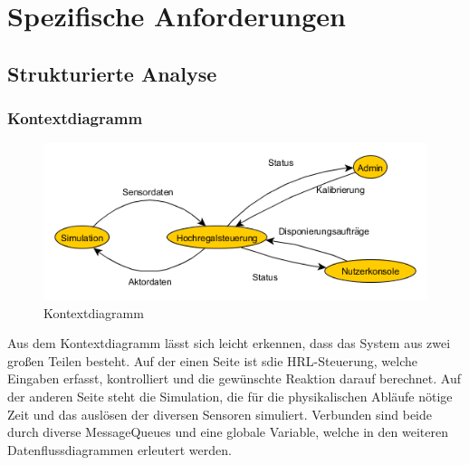 \section{Spezifische Anforderungen}
\subsection{Strukturierte Analyse}
\subsubsection{Kontextdiagramm}
\begin{figure}[H]
	\centering
  \includegraphics[width=\textwidth]{DFD/kontextdiagramm.png}
	\caption{Kontextdiagramm}
	\label{fig1}
\end{figure}
Aus dem Kontextdiagramm lässt sich leicht erkennen, dass das System aus zwei großen Teilen besteht. Auf der einen Seite ist sdie HRL-Steuerung, welche Eingaben erfasst, kontrolliert und die gewünschte Reaktion darauf berechnet. Auf der anderen Seite steht die Simulation, die für die physikalischen Abläufe nötige Zeit und das auslösen der diversen Sensoren simuliert. Verbunden sind beide durch diverse MessageQueues und eine globale Variable, welche in den weiteren Datenflussdiagrammen erleutert werden.
